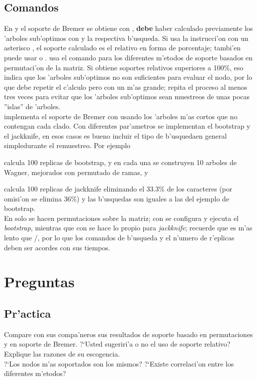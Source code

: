 \subsection{Comandos}
En  y  el soporte de Bremer se obtiene con , \textbf{debe} haber calculado previamente los 'arboles  sub'optimos con  y la respectiva b'usqueda. Si usa la instrucci'on con un asterisco , el soporte calculado es el relativo en forma de porcentaje; tambi'en puede usar \Cmd{bsupport [;} o \Cmd{bsupport ];}.  usa el comando  para los diferentes m'etodos de soporte basados en permutaci'on de la matriz. Si obtiene soportes relativos superiores a 100\%, eso indica que los 'arboles sub'optimos no son suficientes para evaluar el nodo, por lo que debe repetir el c'alculo pero con un  m'as grande; repita el proceso al menos tres veces para evitar que los 'arboles sub'optimos sean muestreos de unas pocas ''islas'' de 'arboles.\\
 implementa el soporte de Bremer con 
 usando los 'arboles m'as cortos que no contengan cada clado. Con diferentes par'ametros se implementan el bootstrap y el jackknife, en esos casos es bueno incluir el tipo de b'usquedaen general simpledurante el remuestreo. Por ejemplo 


calcula 100 replicas de bootstrap, y en cada una se construyen 10 arboles de Wagner, mejorados con permutado de ramas, y 


 calcula 100 replicas de jackknife eliminando el 33.3\% de los caracteres (por omisi'on se elimina 36\%) y las b'usquedas son iguales a las del ejemplo de bootstrap.\\
En  solo se hacen permutaciones sobre la matriz; con  se configura y ejecuta el \textit{bootstrap}, mientras que con   se hace lo propio para \textit{jackknife}; recuerde que  es m'as lento que /, por lo que los comandos de b'usqueda y el n'umero de r'eplicas deben ser acordes con sus tiempos.
\section{Preguntas}
\subsection{Pr'actica}
\noindent
Compare con sus compa'neros sus resultados de soporte basado en permutaciones y en soporte de Bremer. ?`Usted sugeriri'a o no el uso de soporte relativo? Explique las razones de su escogencia.\\
?`Los nodos m'as soportados son los mismos? ?`Existe correlaci'on entre los diferentes m'etodos?
